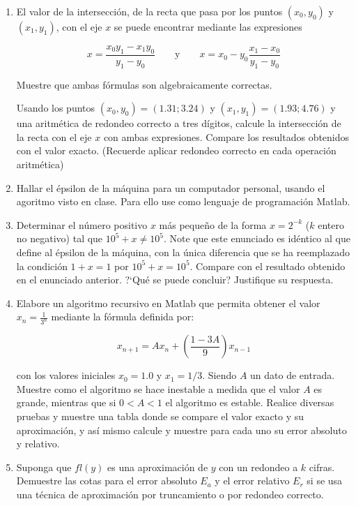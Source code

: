 \documentclass[12pt,letterpaper]{article}
\begin{document}
\begin{enumerate}
\item El valor de la intersecci\'on, de la recta que pasa por los puntos $(x_0,y_0)$ y $(x_1,y_1)$, con el
eje $x$ se puede encontrar mediante las expresiones

$$
x = \frac{x_0y_1-x_1y_0}{y_1-y_0} \qquad \textrm{y} \qquad x = x_0 - y_0\frac{x_1-x_0}{y_1-y_0}
$$

Muestre que ambas f\'ormulas son algebraicamente correctas.

Usando los puntos $(x_0,y_0)=(1.31;3.24)$ y $(x_1,y_1)=(1.93;4.76)$ y una aritm\'etica de redondeo correcto a
tres d\'igitos, calcule la intersecci\'on de la recta con el eje $x$ con ambas expresiones. Compare
los resultados obtenidos con el valor exacto. (Recuerde aplicar redondeo correcto en cada operaci\'on aritm\'etica)



\item Hallar el \'epsilon de la m\'aquina para un computador personal, usando el agoritmo visto en clase. Para ello use como lenguaje de programaci\'on Matlab. 

\item Determinar el n\'umero positivo $x$ m\'as peque\~no de la forma $x = 2^{-k}$ ($k$ entero no negativo) tal que $10^5 +x \neq 10^{5}$. Note que este enunciado es id\'entico al que define al \'epsilon de la m\'aquina, con la \'unica diferencia que se ha reemplazado la condici\'on $1 + x = 1$ por $10^5 + x = 10^5$. Compare con el resultado obtenido en el enunciado anterior. ?`Qu\'e se puede concluir? Justifique su respuesta.

\item Elabore un algoritmo recursivo en Matlab que permita obtener el valor $\displaystyle x_n=\frac{1}{3^n}$ mediante la f\'ormula definida por:

$$
x_{n+1} = Ax_n + \left(\frac{1-3A}{9}\right)x_{n-1}
$$

con los valores iniciales $x_0=1.0$ y $x_1=1/3$. Siendo $A$ un dato de entrada. Muestre como el algoritmo se hace inestable a medida que el valor $A$ es grande, mientras que si $0<A<1$ el algoritmo es estable. Realice diversas pruebas y muestre una tabla donde se compare el valor exacto y su aproximaci\'on, y as\'i mismo calcule y muestre para cada uno su error absoluto y relativo.

\item Suponga que $fl(y)$ es una aproximaci\'on de $y$ con un redondeo a $k$ cifras. Demuestre las cotas para el error absoluto $E_a$ y el error relativo $E_r$ si se usa una t\'ecnica de aproximaci\'on por truncamiento o por redondeo correcto.


\end{enumerate}
\end{document}
